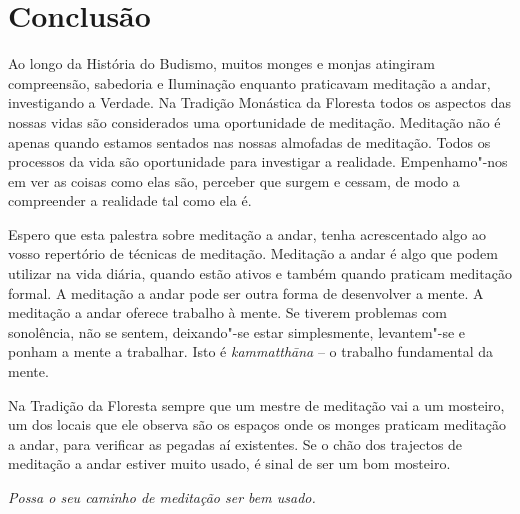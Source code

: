 \chapter{Conclusão}

Ao longo da História do Budismo, muitos monges e monjas atingiram
compreensão, sabedoria e Iluminação enquanto praticavam meditação a
andar, investigando a Verdade. Na Tradição Monástica da Floresta todos
os aspectos das nossas vidas são considerados uma oportunidade de
meditação. Meditação não é apenas quando estamos sentados nas nossas
almofadas de meditação. Todos os processos da vida são oportunidade para
investigar a realidade. Empenhamo"-nos em ver as coisas como elas são,
perceber que surgem e cessam, de modo a compreender a realidade tal como
ela é.

Espero que esta palestra sobre meditação a andar, tenha acrescentado algo
ao vosso repertório de técnicas de meditação. Meditação
a andar é algo que podem utilizar na vida diária, quando estão ativos e
também quando praticam meditação formal. A meditação a andar pode ser
outra forma de desenvolver a mente. A meditação a andar oferece trabalho
à mente. Se tiverem problemas com sonolência, não se sentem, deixando"-se
estar simplesmente, levantem"-se e ponham a mente a trabalhar. Isto é
\emph{kammatthāna} -- o trabalho fundamental da mente.

Na Tradição da Floresta sempre que um mestre de meditação vai a um
mosteiro, um dos locais que ele observa são os espaços onde os monges
praticam meditação a andar, para verificar as pegadas aí existentes. Se
o chão dos trajectos de meditação a andar estiver muito usado, é sinal de
ser um bom mosteiro.

\bigskip

{\Large
\textit{Possa o seu caminho de meditação ser bem usado.}
}

